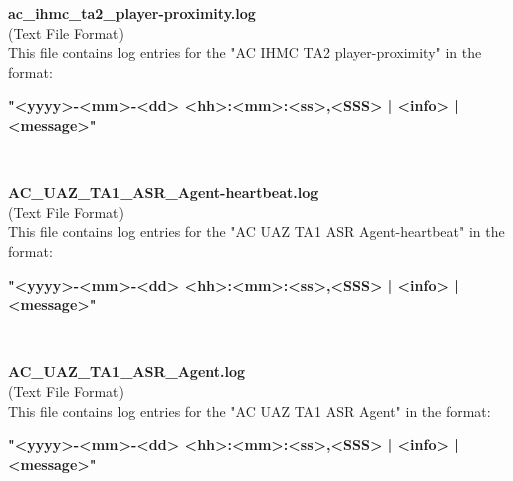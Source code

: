 \begin{description}
\begin{addmargin}[0em]{0em}
    \label{ac_ihmc_ta2_player-proximity.log}
    \begin{addmargin}[1em]{0em} %
        \textbf{ac\_ihmc\_ta2\_player-proximity.log}\\
        (Text File Format)\\
        This file contains log entries for the "AC IHMC TA2 player-proximity" in the format:
        \begin{addmargin}[1em]{0em}
            \textbf{"<yyyy>-<mm>-<dd> <hh>:<mm>:<ss>,<SSS> | <info> | <message>"}
        \end{addmargin}
    \end{addmargin} %
    \textbf{\\}

    \label{AC_UAZ_TA1_ASR_Agent-heartbeat.log}
    \begin{addmargin}[1em]{0em} %
        \textbf{AC\_UAZ\_TA1\_ASR\_Agent-heartbeat.log}\\
        (Text File Format)\\
        This file contains log entries for the "AC UAZ TA1 ASR Agent-heartbeat" in the format:
        \begin{addmargin}[1em]{0em}
            \textbf{"<yyyy>-<mm>-<dd> <hh>:<mm>:<ss>,<SSS> | <info> | <message>"}
        \end{addmargin}
    \end{addmargin} %
    \textbf{\\}

    \label{AC_UAZ_TA1_ASR_Agent.log}
    \begin{addmargin}[1em]{0em} %
        \textbf{AC\_UAZ\_TA1\_ASR\_Agent.log}\\
        (Text File Format)\\
        This file contains log entries for the "AC UAZ TA1 ASR Agent" in the format:
        \begin{addmargin}[1em]{0em}
            \textbf{"<yyyy>-<mm>-<dd> <hh>:<mm>:<ss>,<SSS> | <info> | <message>"}
        \end{addmargin}
    \end{addmargin} %
    \textbf{\\}


\end{addmargin}
\end{description}
